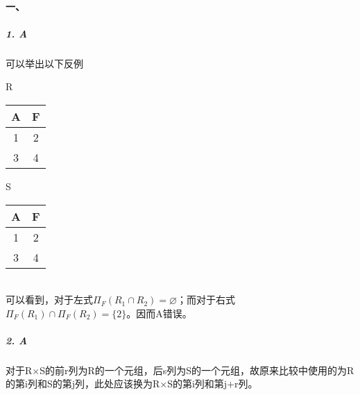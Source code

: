 \documentclass[10pt,a4paper]{article}
\begin{document}
	\pagestyle{main}    %
	
	\setlength{\parskip}{0pt}
	\renewcommand{\baselinestretch}{1.5}
	
    \paragraph{一、}
    \subparagraph{1. A} 可以举出以下反例

    \begin{minipage}{\textwidth} 
        \begin{minipage}[t]{0.35\textwidth} 
        \centering 
        \makeatletter{}\makeatother\caption{R} 
        \begin{tabular}{c|c}
            \hline
            A & F \\ \hline
            1 & 2 \\
            3 & 4 \\
            \hline
        \end{tabular} 
    \end{minipage} 
    \begin{minipage}[t]{0.35\textwidth} 
        \centering 
        \makeatletter{}\makeatother\caption{S} 
        \begin{tabular}{c|c}
            \hline
            A & F \\ \hline
            1 & 2 \\
            3 & 4 \\
            \hline
        \end{tabular} 

    \end{minipage} 

    \end{minipage}
    \vspace{0.5cm}\\
    可以看到，对于左式$\Pi_F(R_1 \cap R_2) = \varnothing$；而对于右式$\Pi_F(R_1) \cap \Pi_F(R_2) = \{2\}$。因而A错误。

    \subparagraph{2. A} 对于R$\times$S的前r列为R的一个元组，后s列为S的一个元组，故原来比较中使用的为R的第i列和S的第j列，此处应该换为R$\times$S的第i列和第j+r列。
\end{document}

